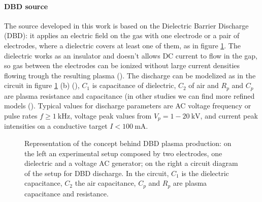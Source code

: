 \paragraph{DBD source}
The source developed in this work is based on the Dielectric Barrier Discharge (DBD): it applies an electric field on the gas with one electrode or a pair of electrodes, where a dielectric covers at least one of them, as in figure \ref{fig:DBDex}.
The dielectric works as an insulator and doesn't allows DC current to flow in the gap, so gas between the electrodes can be ionized without large current densities flowing trough the resulting plasma (\cite{Kogelschatz2003}). The discharge can be modelized as in the circuit in figure \ref{fig:DBDex} (b) (\cite{DBDcircuit}), $C_1$ is capacitance of dielectric, $C_2$ of air and $R_p$ and $C_p$ are plasma resistance and capacitance (in other studies we can find more refined models (\cite{doi:10.1063/1.4986023}). Typical values for discharge parameters are AC voltage frequency or pulse rates $f \ge \SI{1}{\kilo\hertz}$, voltage peak values from $V_{p} = 1 - \SI{20}{\kilo\volt}$, and current peak intensities on a conductive target $I < \SI{100}{\milli\ampere}$.
\begin{figure}
 \centering
 \hfill
 \caption{Representation of the concept behind DBD plasma production: on the left  an experimental setup composed by two electrodes, one dielectric and a voltage AC generator; on the right a circuit diagram of the setup for DBD discharge. In the circuit, $C_1$ is the dielectric capacitance, $C_2$ the air capacitance, $C_p$ and $R_p$ are plasma capacitance and resistance.}
 \label{fig:DBDex}
\end{figure}

